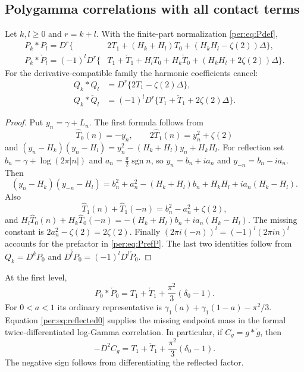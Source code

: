\subsection{Polygamma correlations with all contact terms}

\begin{theorem}
\label{per:thm:polycorr}
Let $k,l\ge0$ and $r=k+l$. With the finite-part normalization
\eqref{per:eq:Pdef},
\begin{align}
 P_k*P_l=D^r\bigl\{&2T_1+(H_k+H_l)T_0
                         +(H_kH_l-\zeta(2))\Delta\bigr\},
 \label{per:eq:PP}\\
 P_k*\check P_l=(-1)^lD^r\bigl\{&T_1+\check T_1
                   +H_lT_0+H_k\check T_0
                   +(H_kH_l+2\zeta(2))\Delta\bigr\}.
 \label{per:eq:PrefP}
\end{align}
For the derivative-compatible family the harmonic coefficients cancel:
\begin{align}
 Q_k*Q_l&=D^r\{2T_1-\zeta(2)\Delta\},
 \label{per:eq:QQ}\\
 Q_k*\check Q_l&=(-1)^lD^r
              \{T_1+\check T_1+2\zeta(2)\Delta\}.
 \label{per:eq:QrefQ}
\end{align}
\end{theorem}

\begin{proof}
Put $y_n=\gamma+L_n$. The first formula follows from
\[
 \widehat T_0(n)=-y_n,\qquad
 2\widehat T_1(n)=y_n^2+\zeta(2)
\]
and $(y_n-H_k)(y_n-H_l)=y_n^2-(H_k+H_l)y_n+H_kH_l$.
For reflection set $b_n=\gamma+\log(2\pi|n|)$ and
$a_n=\frac\pi2\operatorname{sgn}n$, so $y_n=b_n+ia_n$ and
$y_{-n}=b_n-ia_n$. Then
\[
 (y_n-H_k)(y_{-n}-H_l)
 =b_n^2+a_n^2-(H_k+H_l)b_n+H_kH_l
                                      +ia_n(H_k-H_l).
\]
Also
\[
 \widehat T_1(n)+\widehat T_1(-n)=b_n^2-a_n^2+\zeta(2),
\]
and
$H_l\widehat T_0(n)+H_k\widehat T_0(-n)
=-(H_k+H_l)b_n+ia_n(H_k-H_l)$.
The missing constant is $2a_n^2-\zeta(2)=2\zeta(2)$.
Finally $(2\pi i(-n))^l=(-1)^l(2\pi in)^l$ accounts for the
prefactor in \eqref{per:eq:PrefP}. The last two identities follow
from $Q_k=D^kP_0$ and $\check{D^lP_0}=(-1)^lD^l\check P_0$.
\end{proof}

At the first level,
\begin{equation}\label{per:eq:reflected0}
 P_0*\check P_0=T_1+\check T_1+
                         \frac{\pi^2}{3}(\delta_0-1).
\end{equation}
For $0<a<1$ its ordinary representative is
$\gamma_1(a)+\gamma_1(1-a)-\pi^2/3$. Equation
\eqref{per:eq:reflected0} supplies the missing endpoint mass in the
formal twice-differentiated log-Gamma correlation. In particular, if
$C_g=g*\check g$, then
\begin{equation}\label{per:eq:Cg}
 -D^2C_g=T_1+\check T_1+\frac{\pi^2}{3}(\delta_0-1).
\end{equation}
The negative sign follows from differentiating the reflected factor.

